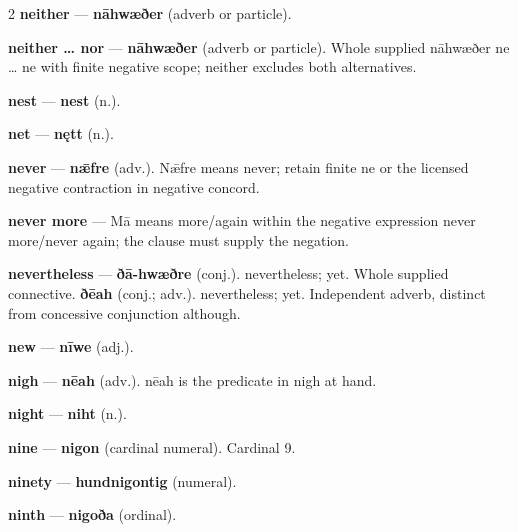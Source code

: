 \begin{multicols}{2}
\textbf{neither} — \textbf{nāhwæðer} (adverb or particle).\par
\textbf{neither … nor} — \textbf{nāhwæðer} (adverb or particle). Whole supplied nāhwæðer ne … ne with finite negative scope; neither excludes both alternatives.\par
\textbf{nest} — \textbf{nest} (n.).\par
\textbf{net} — \textbf{nętt} (n.).\par
\textbf{never} — \textbf{nǣfre} (adv.). Nǣfre means never; retain finite ne or the licensed negative contraction in negative concord.\par
\textbf{never more} — Mā means more/again within the negative expression never more/never again; the clause must supply the negation.\par
\textbf{nevertheless} — \textbf{ðā-hwæðre} (conj.). nevertheless; yet. Whole supplied connective. \textbf{ðēah} (conj.; adv.). nevertheless; yet. Independent adverb, distinct from concessive conjunction although.\par
\textbf{new} — \textbf{nīwe} (adj.).\par
\textbf{nigh} — \textbf{nēah} (adv.). nēah is the predicate in nigh at hand.\par
\textbf{night} — \textbf{niht} (n.).\par
\textbf{nine} — \textbf{nigon} (cardinal numeral). Cardinal 9.\par
\textbf{ninety} — \textbf{hundnigontig} (numeral).\par
\textbf{ninth} — \textbf{nigoða} (ordinal).\par

\end{multicols}
